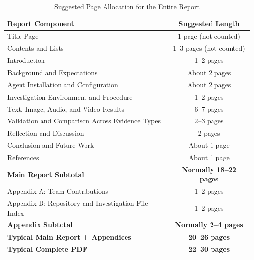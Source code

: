 \documentclass[12pt,letterpaper]{article}
\begin{document}
\begin{table}[htbp]
    \centering
    \caption{Suggested Page Allocation for the Entire Report}
    \label{tab:page-allocation}
    \small
    \begin{tabular}{|l|c|}
        \hline
        \textbf{Report Component}                           & \textbf{Suggested Length}      \\
        \hline
        Title Page                                          & 1 page (not counted)           \\
        Contents and Lists                                  & 1--3 pages (not counted)       \\
        \hline
        Introduction                                        & 1--2 pages                     \\
        Background and Expectations                         & About 2 pages                  \\
        Agent Installation and Configuration                & About 2 pages                  \\
        Investigation Environment and Procedure             & 1--2 pages                     \\
        Text, Image, Audio, and Video Results               & 6--7 pages                     \\
        Validation and Comparison Across Evidence Types     & 2--3 pages                     \\
        Reflection and Discussion                           & 2 pages                        \\
        Conclusion and Future Work                          & About 1 page                   \\
        References                                          & About 1 page                   \\
        \hline
        \textbf{Main Report Subtotal}                       & \textbf{Normally 18--22 pages} \\
        \hline
        Appendix A: Team Contributions                      & 1--2 pages                     \\
        Appendix B: Repository and Investigation-File Index & 1--2 pages                     \\
        \hline
        \textbf{Appendix Subtotal}                          & \textbf{Normally 2--4 pages}   \\
        \hline
        \textbf{Typical Main Report + Appendices}           & \textbf{20--26 pages}          \\
        \hline
        \textbf{Typical Complete PDF}                       & \textbf{22--30 pages}          \\
        \hline
    \end{tabular}
\end{table}
\end{document}
